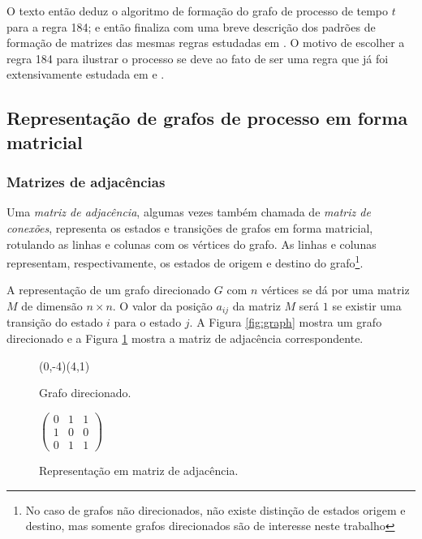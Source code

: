\documentclass[12pt,a4paper]{article}
\let\vState=\origState
\begin{document}
O texto então deduz o algoritmo de formação do grafo de processo
de tempo $t$ para a regra 184; e então finaliza com uma breve
descrição dos padrões de formação de matrizes das mesmas regras
estudadas em . O motivo de escolher
a regra 184 para ilustrar o processo se deve ao fato de ser
uma regra que já foi extensivamente estudada em 
e .

\subsection{Representação de grafos de processo em forma matricial}

\subsubsection{Matrizes de adjacências}

Uma \textit{matriz de adjacência}, algumas vezes também chamada de 
\textit{matriz de conexões}, representa os estados e transições de grafos
em forma matricial, rotulando as linhas e colunas com os vértices do grafo.
As linhas e colunas representam, respectivamente, os estados de origem e destino
do grafo\footnote{No caso de grafos não direcionados, não existe
distinção de estados origem e destino, mas somente grafos direcionados são 
de interesse neste trabalho}.

A representação de um grafo direcionado $G$ com $n$ vértices se dá por uma
matriz $M$ de dimensão $n \times n$. O valor da posição $a_{ij}$ da matriz
$M$ será $1$ se existir uma transição do estado $i$ para o estado $j$.
A Figura \ref{fig:graph} mostra um grafo direcionado e a Figura \ref{fig:adjm}
mostra a matriz de adjacência correspondente.

\begin{figure}[ht]
\begin{minipage}[b]{0.5\linewidth}
\begin{center}
\begin{VCPicture}{(0,-4)(4,1)}
\vState[1]{(0,0)}{A} \vState[2]{(4,0)}{B}
\vState[3]{(2,-2)}{C}
  
 
\end{VCPicture}
\caption{Grafo direcionado.}
\label{fig:graph}
\end{center}
\end{minipage}
\hspace{0.5cm}
\begin{minipage}[b]{0.5\linewidth}
\begin{center}
\begin{math}
\begin{pmatrix}
0 & 1 & 1 \\
1 & 0 & 0 \\
0 & 1 & 1
\end{pmatrix}
\end{math}
\caption{Representação em matriz de adjacência.}
\label{fig:adjm}
\end{center}
\end{minipage}
\end{figure}
\end{document}
